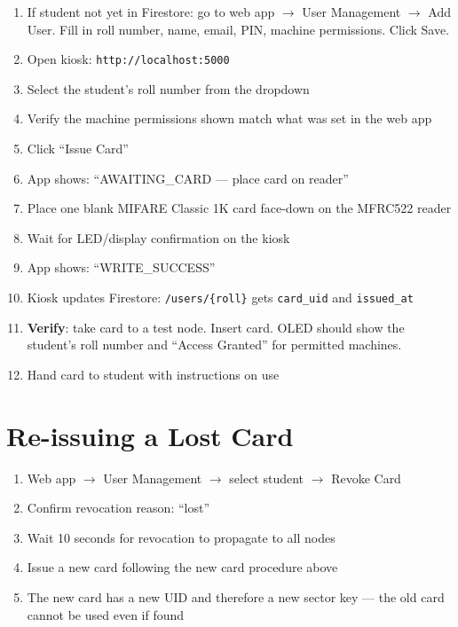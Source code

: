 \begin{enumerate}[leftmargin=1.5em]
    \item If student not yet in Firestore: go to web app $\rightarrow$ User Management $\rightarrow$ Add User. Fill in roll number, name, email, PIN, machine permissions. Click Save.
    \item Open kiosk: \texttt{http://localhost:5000}
    \item Select the student's roll number from the dropdown
    \item Verify the machine permissions shown match what was set in the web app
    \item Click ``Issue Card''
    \item App shows: ``AWAITING\_CARD — place card on reader''
    \item Place one blank MIFARE Classic 1K card face-down on the MFRC522 reader
    \item Wait for LED/display confirmation on the kiosk
    \item App shows: ``WRITE\_SUCCESS''
    \item Kiosk updates Firestore: \texttt{/users/\{roll\}} gets \texttt{card\_uid} and \texttt{issued\_at}
    \item \textbf{Verify}: take card to a test node. Insert card. OLED should show the student's roll number and ``Access Granted'' for permitted machines.
    \item Hand card to student with instructions on use
\end{enumerate}

\section{Re-issuing a Lost Card}

\begin{enumerate}[leftmargin=1.5em]
    \item Web app $\rightarrow$ User Management $\rightarrow$ select student $\rightarrow$ Revoke Card
    \item Confirm revocation reason: ``lost''
    \item Wait 10 seconds for revocation to propagate to all nodes
    \item Issue a new card following the new card procedure above
    \item The new card has a new UID and therefore a new sector key --- the old card cannot be used even if found
\end{enumerate}

